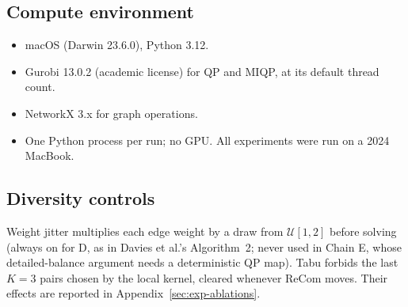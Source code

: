 \documentclass[11pt]{article}
\begin{document}
\subsection{Compute environment}\label{app:compute}

\begin{itemize}
  \item macOS (Darwin 23.6.0), Python 3.12.
  \item Gurobi 13.0.2 (academic license) for QP and MIQP, at its
    default thread count.
  \item NetworkX 3.x for graph operations.
  \item One Python process per run; no GPU. All experiments were run
    on a 2024 MacBook.
\end{itemize}

\subsection{Diversity controls}\label{app:diversity}

Weight jitter multiplies each edge weight by a draw from
$\mathcal{U}[1, 2]$ before solving (always on for D, as in Davies et
al.'s Algorithm~2; never used in Chain E, whose detailed-balance
argument needs a deterministic QP map). Tabu forbids the last $K = 3$
pairs chosen by the local kernel, cleared whenever ReCom moves.
Their effects are reported in Appendix~\ref{sec:exp-ablations}.




\end{document}
